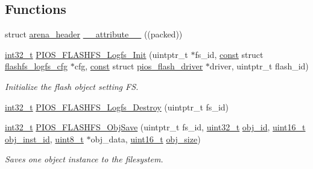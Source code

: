 \subsection*{Functions}
\begin{DoxyCompactItemize}
\item 
struct \hyperlink{structarena__header}{arena\-\_\-header} \hyperlink{group___p_i_o_s___f_l_a_s_h_f_s_gaf0823c3e99bb9ab51cfc8a807339ad1b}{\-\_\-\-\_\-attribute\-\_\-\-\_\-} ((packed))
\item 
\hyperlink{group___n_a_m_e_gafd12020da5a235dfcf0c3c748fb5baed}{int32\-\_\-t} \hyperlink{group___p_i_o_s___f_l_a_s_h_f_s_ga2597ca18b2f818f6b2aee1e29cc661e2}{P\-I\-O\-S\-\_\-\-F\-L\-A\-S\-H\-F\-S\-\_\-\-Logfs\-\_\-\-Init} (uintptr\-\_\-t $\ast$fs\-\_\-id, \hyperlink{group___n_a_m_e_ga7ae6d0e43244213b34de2c2b9aa30da6}{const} struct \hyperlink{structflashfs__logfs__cfg}{flashfs\-\_\-logfs\-\_\-cfg} $\ast$cfg, \hyperlink{group___n_a_m_e_ga7ae6d0e43244213b34de2c2b9aa30da6}{const} struct \hyperlink{structpios__flash__driver}{pios\-\_\-flash\-\_\-driver} $\ast$driver, uintptr\-\_\-t flash\-\_\-id)
\begin{DoxyCompactList}\small\item\em Initialize the flash object setting F\-S. \end{DoxyCompactList}\item 
\hyperlink{group___n_a_m_e_gafd12020da5a235dfcf0c3c748fb5baed}{int32\-\_\-t} \hyperlink{group___p_i_o_s___f_l_a_s_h_f_s_ga2fdf3f16270fb9c7f85a4c7a9bfce2ce}{P\-I\-O\-S\-\_\-\-F\-L\-A\-S\-H\-F\-S\-\_\-\-Logfs\-\_\-\-Destroy} (uintptr\-\_\-t fs\-\_\-id)
\item 
\hyperlink{group___n_a_m_e_gafd12020da5a235dfcf0c3c748fb5baed}{int32\-\_\-t} \hyperlink{group___p_i_o_s___f_l_a_s_h_f_s_ga2566e681162e422c1457f10146eda492}{P\-I\-O\-S\-\_\-\-F\-L\-A\-S\-H\-F\-S\-\_\-\-Obj\-Save} (uintptr\-\_\-t fs\-\_\-id, \hyperlink{stdint_8h_a435d1572bf3f880d55459d9805097f62}{uint32\-\_\-t} \hyperlink{posix_2posix_2pios__flashfs__logfs_8c_a4901f00431a2c948153bd4f187fce556}{obj\-\_\-id}, \hyperlink{stdint_8h_a273cf69d639a59973b6019625df33e30}{uint16\-\_\-t} \hyperlink{posix_2posix_2pios__flashfs__logfs_8c_a7930e82075aa4e3326ad9615090b5d61}{obj\-\_\-inst\-\_\-id}, \hyperlink{stdint_8h_aba7bc1797add20fe3efdf37ced1182c5}{uint8\-\_\-t} $\ast$obj\-\_\-data, \hyperlink{stdint_8h_a273cf69d639a59973b6019625df33e30}{uint16\-\_\-t} \hyperlink{posix_2posix_2pios__flashfs__logfs_8c_acd6c9a9729f524a58be43afcb2d0782a}{obj\-\_\-size})
\begin{DoxyCompactList}\small\item\em Saves one object instance to the filesystem. \end{DoxyCompactList}\item 

\end{DoxyCompactItemize}
